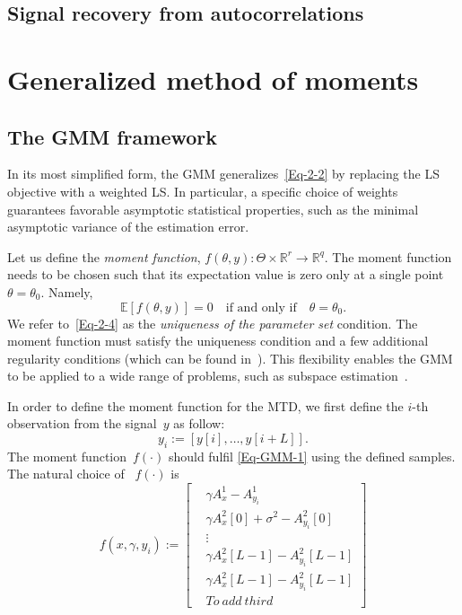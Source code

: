 \documentclass{article}
\newcommand{\E}[0]{\mathbb{E}}
\newcommand{\R}[0]{\mathbb{R}}
\begin{document}
\subsection{Signal recovery from autocorrelations}

\section{Generalized method of moments}
\label{gmm}
\subsection{The GMM framework}\label{gmm:framwork}

In its most simplified form, the GMM generalizes~\eqref{Eq-2-2} by replacing the LS objective with a weighted LS. In particular, a specific choice of weights guarantees favorable asymptotic statistical properties, such as {the} minimal asymptotic variance of the estimation error.

Let us define the \textit{moment function}, $f(\theta, y)\colon \Theta \times \R^r \to \R^q$. The moment function needs to be chosen such that its expectation value is zero only at a single point $\theta=\theta_0$. Namely,
\begin{equation}\label{Eq-GMM-1}
	\E\left[f(\theta,y)\right] = 0 \quad \text{if and only if} \quad \theta = \theta_0.
\end{equation}
We refer to~\eqref{Eq-2-4} as the \textit{uniqueness of the parameter set} condition. The moment function must satisfy the uniqueness condition and a few additional regularity conditions (which can be found in~\cite{Hansen1982, abas2021generalized}). This flexibility enables the GMM to be applied to a wide range of problems, such as subspace estimation~\cite{Fan2018}.

In order to define the moment function for the MTD, we first define the $i$-th observation from the signal~$y$ as follow:
\begin{equation}
	y_i := [y[i],\ldots, y[i+L]].
\end{equation}
The moment function~$f(\cdot)$ should fulfil \eqref{Eq-GMM-1} using the defined samples. The natural choice of ~$f(\cdot)$ is
\begin{equation}
	f(x,\gamma,y_i) := 
	\begin{bmatrix}
		&\gamma A_x^1 - A_{y_i}^1\\
		&\gamma A_x^2[0] +\sigma^2 - A_{y_i}^2[0]\\
		&\vdots \\
		&\gamma A_x^2[L-1] - A_{y_i}^2[L-1]\\
		&\gamma A_x^2[L-1] - A_{y_i}^2[L-1]\\ 
		&To \ add \  third
	\end{bmatrix}
\end{equation}
\end{document}
